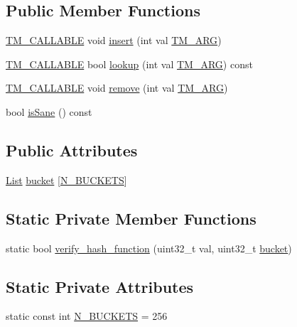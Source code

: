 \subsection*{Public Member Functions}
\begin{DoxyCompactItemize}
\item 
\hyperlink{tm_8h_adf0341d9b0d169f1aba20257caed702e}{T\-M\-\_\-\-C\-A\-L\-L\-A\-B\-L\-E} void \hyperlink{classHashTable_a438d8bd36dbc6e946c92ff31655fa4e0}{insert} (int val \hyperlink{tm_8h_a030f4350a175fed7a99c242cbaa53258}{T\-M\-\_\-\-A\-R\-G})
\item 
\hyperlink{tm_8h_adf0341d9b0d169f1aba20257caed702e}{T\-M\-\_\-\-C\-A\-L\-L\-A\-B\-L\-E} bool \hyperlink{classHashTable_afc24322b6018e44c24b55d4fe60917dc}{lookup} (int val \hyperlink{tm_8h_a030f4350a175fed7a99c242cbaa53258}{T\-M\-\_\-\-A\-R\-G}) const 
\item 
\hyperlink{tm_8h_adf0341d9b0d169f1aba20257caed702e}{T\-M\-\_\-\-C\-A\-L\-L\-A\-B\-L\-E} void \hyperlink{classHashTable_a15759896e8e9960cd44fa70673bec921}{remove} (int val \hyperlink{tm_8h_a030f4350a175fed7a99c242cbaa53258}{T\-M\-\_\-\-A\-R\-G})
\item 
bool \hyperlink{classHashTable_ad7ef164978b3a4e34d27d175ccbaecfb}{is\-Sane} () const 
\end{DoxyCompactItemize}
\subsection*{Public Attributes}
\begin{DoxyCompactItemize}
\item 
\hyperlink{classList}{List} \hyperlink{classHashTable_a43d16ae8fc0f530758b5924a8ab7a9c6}{bucket} \mbox{[}\hyperlink{classHashTable_a61024c536f9eb01bb0327ba3ed5361cc}{N\-\_\-\-B\-U\-C\-K\-E\-T\-S}\mbox{]}
\end{DoxyCompactItemize}
\subsection*{Static Private Member Functions}
\begin{DoxyCompactItemize}
\item 
static bool \hyperlink{classHashTable_a45e8619d114405fe58a54402a3eb8624}{verify\-\_\-hash\-\_\-function} (uint32\-\_\-t val, uint32\-\_\-t \hyperlink{classHashTable_a43d16ae8fc0f530758b5924a8ab7a9c6}{bucket})
\end{DoxyCompactItemize}
\subsection*{Static Private Attributes}
\begin{DoxyCompactItemize}
\item 
static const int \hyperlink{classHashTable_a61024c536f9eb01bb0327ba3ed5361cc}{N\-\_\-\-B\-U\-C\-K\-E\-T\-S} = 256
\end{DoxyCompactItemize}


